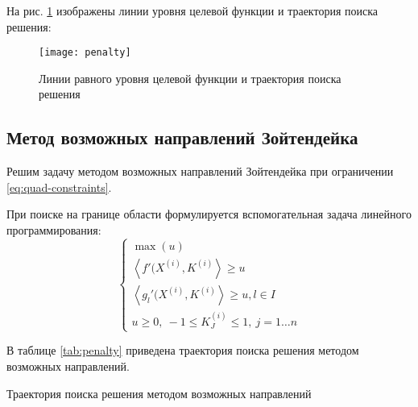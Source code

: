 На рис. \ref{pic:penalty} изображены линии уровня целевой функции и траектория поиска решения:

\begin{figure}[H]
\begin{center}
	\texttt{[image: penalty]}
	\caption{Линии равного уровня целевой функции и траектория поиска решения}
	\label{pic:penalty}
\end{center}
\end{figure}

\subsection{Метод возможных направлений Зойтендейка}

Решим задачу методом возможных направлений Зойтендейка при ограничении \ref{eq:quad-constraints}.

При поиске на границе области формулируется вспомогательная задача линейного программирования:
\begin{equation*}
\begin{cases}
	\max(u)
	\\
	\left\langle f'(X^{(i)}, K^{(i)} \right\rangle \geq u
	\\
	\left\langle g_l'(X^{(i)}, K^{(i)} \right\rangle \geq u, l \in I
	\\
	u \geq 0,\ -1 \leq K_J^{(i)} \leq 1,\ j = 1 \dots n
\end{cases}
\end{equation*}

В таблице \ref{tab:penalty} приведена траектория поиска решения методом возможных направлений.

\begin{table}[H]
\begin{center}
	\caption{Траектория поиска решения методом возможных направлений}
	\label{tab:available}
	\def\tabcolsep{18pt}
	\def\arraystretch{1.0}
	\fontsize{13}{14}\selectfont
\end{center}
\end{table}

